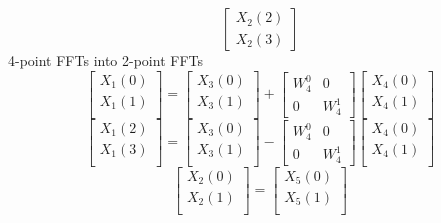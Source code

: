 \documentclass[journal,12pt,twocolumn]{IEEEtran}
\renewcommand\thesection{\arabic{section}}
\begin{document}
\begin{enumerate}[label=\thesection.\arabic*]
\begin{equation}
\begin{bmatrix}
X_{2}(2) \\
X_{2}(3)
\end{bmatrix}
\label{eq:8-high}
\end{equation}
4-point FFTs into 2-point FFTs
\begin{equation}
\begin{bmatrix}
X_{1}(0) \\ 
X_{1}(1)\\ 
\end{bmatrix}
=
\begin{bmatrix}
X_{3}(0) \\ 
X_{3}(1)\\ 
\end{bmatrix}
+
\begin{bmatrix}
W^{0}_{4} & 0\\
0 & W^{1}_{4}
\end{bmatrix}
\begin{bmatrix}
X_{4}(0) \\ 
X_{4}(1) \\ 
\end{bmatrix}
\label{eq:4-1-high}
\end{equation}
\begin{equation}
\begin{bmatrix}
X_{1}(2) \\ 
X_{1}(3)\\ 
\end{bmatrix}
=
\begin{bmatrix}
X_{3}(0) \\ 
X_{3}(1)\\ 
\end{bmatrix}
-
\begin{bmatrix}
W^{0}_{4} & 0\\
0 & W^{1}_{4}
\end{bmatrix}
\begin{bmatrix}
X_{4}(0) \\ 
X_{4}(1) \\ 
\end{bmatrix}
\label{eq:4-1-low}
\end{equation}
\begin{equation}
\begin{bmatrix}
X_{2}(0) \\ 
X_{2}(1)\\ 
\end{bmatrix}
=
\begin{bmatrix}
X_{5}(0) \\ 
X_{5}(1)\\ 
\end{bmatrix}

\end{equation}
\end{enumerate}
\end{document}
